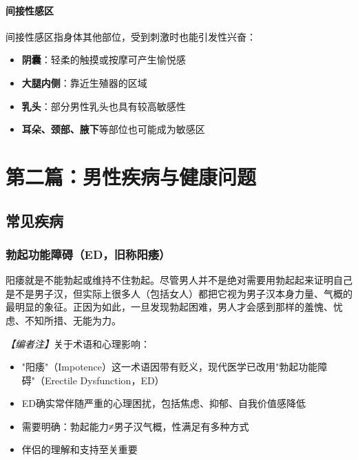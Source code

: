 \subsection{间接性感区}

间接性感区指身体其他部位，受到刺激时也能引发性兴奋：

\begin{itemize}
    \item \textbf{阴囊}：轻柔的触摸或按摩可产生愉悦感
    \item \textbf{大腿内侧}：靠近生殖器的区域
    \item \textbf{乳头}：部分男性乳头也具有较高敏感性
    \item \textbf{耳朵、颈部、腋下}等部位也可能成为敏感区
\end{itemize}

\part{第二篇：男性疾病与健康问题}

\chapter{常见疾病}

\section{勃起功能障碍（ED，旧称阳痿）}

阳痿就是不能勃起或维持不住勃起。尽管男人并不是绝对需要用勃起起来证明自己是不是男子汉，但实际上很多人（包括女人）都把它视为男子汉本身力量、气概的最明显的象征。正因为如此，一旦发现勃起困难，男人才会感到那样的羞愧、忧虑、不知所措、无能为力。

\noindent\textit{【编者注】}关于术语和心理影响：
\begin{itemize}
	\item "阳痿"（Impotence）这一术语因带有贬义，现代医学已改用"勃起功能障碍"（Erectile Dysfunction，ED）
	\item ED确实常伴随严重的心理困扰，包括焦虑、抑郁、自我价值感降低
	\item 需要明确：勃起能力≠男子汉气概，性满足有多种方式
	\item 伴侣的理解和支持至关重要
\end{itemize}

